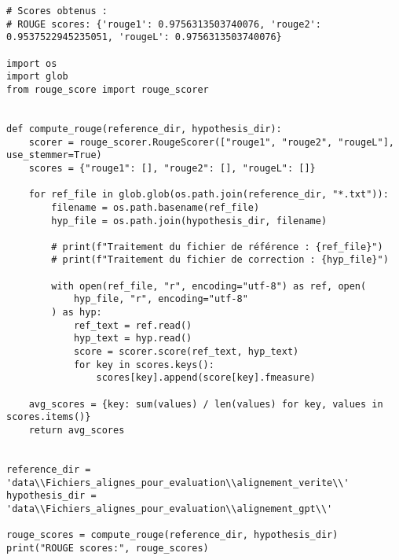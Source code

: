 \begin{verbatim}
# Scores obtenus :
# ROUGE scores: {'rouge1': 0.9756313503740076, 'rouge2': 0.9537522945235051, 'rougeL': 0.9756313503740076}

import os
import glob
from rouge_score import rouge_scorer


def compute_rouge(reference_dir, hypothesis_dir):
    scorer = rouge_scorer.RougeScorer(["rouge1", "rouge2", "rougeL"], use_stemmer=True)
    scores = {"rouge1": [], "rouge2": [], "rougeL": []}

    for ref_file in glob.glob(os.path.join(reference_dir, "*.txt")):
        filename = os.path.basename(ref_file)
        hyp_file = os.path.join(hypothesis_dir, filename)

        # print(f"Traitement du fichier de référence : {ref_file}")
        # print(f"Traitement du fichier de correction : {hyp_file}")

        with open(ref_file, "r", encoding="utf-8") as ref, open(
            hyp_file, "r", encoding="utf-8"
        ) as hyp:
            ref_text = ref.read()
            hyp_text = hyp.read()
            score = scorer.score(ref_text, hyp_text)
            for key in scores.keys():
                scores[key].append(score[key].fmeasure)

    avg_scores = {key: sum(values) / len(values) for key, values in scores.items()}
    return avg_scores


reference_dir = 'data\\Fichiers_alignes_pour_evaluation\\alignement_verite\\'
hypothesis_dir = 'data\\Fichiers_alignes_pour_evaluation\\alignement_gpt\\'

rouge_scores = compute_rouge(reference_dir, hypothesis_dir)
print("ROUGE scores:", rouge_scores)
\end{verbatim}